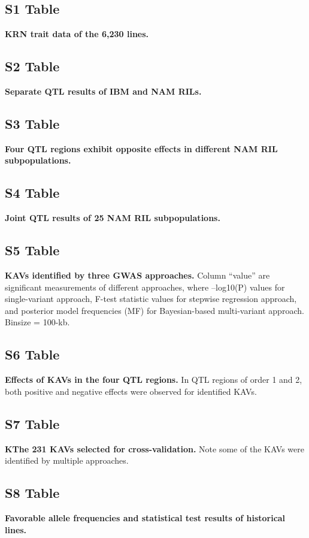 \documentclass[10pt,letterpaper]{article}
\begin{document}
\subsection*{S1 Table}
\label{Table_S1}
{\bf KRN trait data of the 6,230 lines.}

\subsection*{S2 Table}
\label{Table_S2}
{\bf Separate QTL results of IBM and NAM RILs.}

\subsection*{S3 Table}
\label{Table_S3}
{\bf Four QTL regions exhibit opposite effects in different NAM RIL subpopulations.}

\subsection*{S4 Table}
\label{Table_S4}
{\bf Joint QTL results of 25 NAM RIL subpopulations.}

\subsection*{S5 Table}
\label{Table_S5}
{\bf KAVs identified by three GWAS approaches.} Column “value” are significant measurements of different approaches, where –log10(P) values for single-variant approach, F-test statistic values for stepwise regression approach, and posterior model frequencies (MF) for Bayesian-based multi-variant approach. Binsize  = 100-kb.

\subsection*{S6 Table}
\label{Table_S6}
{\bf Effects of KAVs in the four QTL regions.} In QTL regions of order 1 and 2, both positive and negative effects were observed for identified KAVs. 

\subsection*{S7 Table}
\label{Table_S7}
{\bf KThe 231 KAVs selected for cross-validation.} Note some of the KAVs were identified by multiple approaches. 

\subsection*{S8 Table}
\label{Table_S8}
{\bf Favorable allele frequencies and statistical test results of historical lines. }
\end{document}
